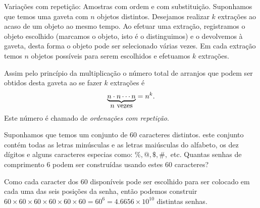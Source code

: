 \begin{frame}{Variações com repetição: Amostras com ordem e com substituição.} Suponhamos que temos uma gaveta com $n$  objetos distintos. Desejamos realizar $k$ extrações ao acaso de um objeto ao mesmo tempo. Ao efetuar uma extração, registramos o objeto escolhido (marcamos o objeto, isto é o distinguimos) e o devolvemos à gaveta, desta forma o objeto pode ser selecionado várias vezes. Em cada extração temos $n$ objetos possíveis para serem escolhidos e efetuamos $k$ extrações. 

Assim pelo princípio da multiplicação o número total de arranjos que podem ser obtidos desta gaveta ao se fazer $k$ extrações é 
$$\displaystyle{\underbrace{n\cdot n\cdots n}_{\text{\normalsize $n$ vezes}}=n^k.}$$ 
Este número é chamado de {\it ordenações com repetição}. 

\begin{exem}
Suponhamos que temos um conjunto de 60 caracteres distintos. este conjunto contém todas as letras minúsculas e as letras maiúsculas do alfabeto, os dez dígitos e alguns caracteres especias como: $\%, @, \$, \#,$ etc. Quantas senhas de comprimento 6 podem ser construídas usando estes 60 caracteres?

Como cada caracter dos 60 disponíveis pode ser escolhido para ser colocado em cada uma das seis posições da senha, então podemos construir $60 \times 60 \times 60 \times 60 \times 60 \times 60= 60^6 =4.6656\times 10^{10} $ distintas senhas.
\end{exem}


\end{frame}



